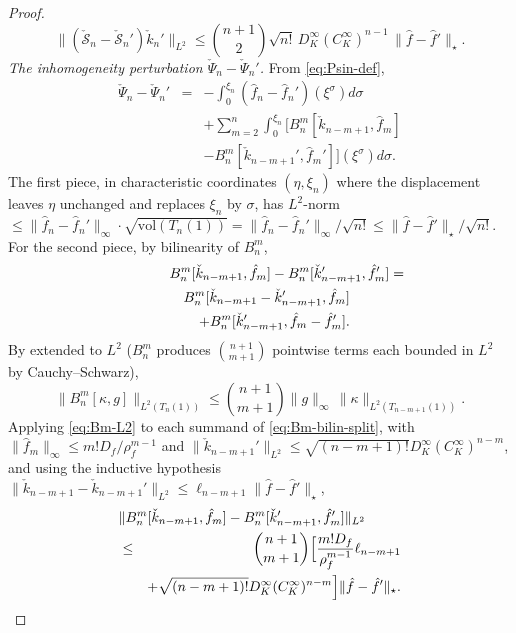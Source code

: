 \documentclass[journal,twoside,web]{ieeecolor}
\begin{document}
\begin{proof}
\begin{equation}
\|(\check{\mathcal S}_n-\check{\mathcal S}_n')\check k_n'\|_{L^2}\le \binom{n+1}{2}\sqrt{n!}\,D_K^\infty(C_K^\infty)^{n-1}\,\|\hat f-\hat f'\|_\star.
\end{equation}
\emph{The inhomogeneity perturbation $\check\Psi_n-\check\Psi_n'$.} From \eqref{eq:Psin-def},
\begin{eqnarray}
\check\Psi_n-\check\Psi_n' &=& -\int_0^{\xi_n}\!(\hat f_n-\hat f_n')(\xi^\sigma)d\sigma \nonumber\\
&& +\sum_{m=2}^n\!\int_0^{\xi_n}\!\!\big[B^m_n[\check k_{n-m+1},\hat f_m] \nonumber\\
&& -B^m_n[\check k_{n-m+1}',\hat f_m']\big](\xi^\sigma)d\sigma. \label{eq:Psi-diff}
\end{eqnarray}
The first piece, in characteristic coordinates $(\eta,\xi_n)$ where the displacement leaves $\eta$ unchanged and replaces $\xi_n$ by $\sigma$, has $L^2$-norm $\le\|\hat f_n-\hat f_n'\|_\infty\cdot\sqrt{\mathrm{vol}(T_n(1))}=\|\hat f_n-\hat f_n'\|_\infty/\sqrt{n!}\le\|\hat f-\hat f'\|_\star/\sqrt{n!}$.
For the second piece, by bilinearity of $B^m_n$,
\begin{eqnarray}
\lefteqn{B^m_n[\check k_{n-m+1},\hat f_m]-B^m_n[\check k_{n-m+1}',\hat f_m']=} \nonumber\\
&& B^m_n[\check k_{n-m+1}-\check k_{n-m+1}',\hat f_m] \nonumber\\
&& +B^m_n[\check k_{n-m+1}',\hat f_m-\hat f_m']. \label{eq:Bm-bilin-split}
\end{eqnarray}
By \cite[Lemma~A.1]{HV1} extended to $L^2$ ($B^m_n$ produces $\binom{n+1}{m+1}$ pointwise terms each bounded in $L^2$ by Cauchy--Schwarz),
\begin{equation}\label{eq:Bm-L2}
\|B^m_n[\kappa,g]\|_{L^2(T_n(1))}\le \binom{n+1}{m+1}\|g\|_\infty\,\|\kappa\|_{L^2(T_{n-m+1}(1))}.
\end{equation}
Applying \eqref{eq:Bm-L2} to each summand of \eqref{eq:Bm-bilin-split}, with $\|\hat f_m\|_\infty\le m!D_f/\rho_f^{m-1}$ and $\|\check k_{n-m+1}'\|_{L^2}\le\sqrt{(n-m+1)!}D_K^\infty(C_K^\infty)^{n-m}$, and using the inductive hypothesis $\|\check k_{n-m+1}-\check k_{n-m+1}'\|_{L^2}\le\ell_{n-m+1}\|\hat f-\hat f'\|_\star$,
\begin{eqnarray}
\lefteqn{\|B^m_n[\check k_{n-m+1},\hat f_m]-B^m_n[\check k_{n-m+1}',\hat f_m']\|_{L^2}} \nonumber\\
&\le& \binom{n+1}{m+1}\Big[\frac{m!D_f}{\rho_f^{m-1}}\ell_{n-m+1} \nonumber\\
&& +\sqrt{(n-m+1)!}D_K^\infty(C_K^\infty)^{n-m}\Big]\|\hat f-\hat f'\|_\star. \label{eq:Bm-diff-final}

\end{eqnarray}
\end{proof}
\end{document}
